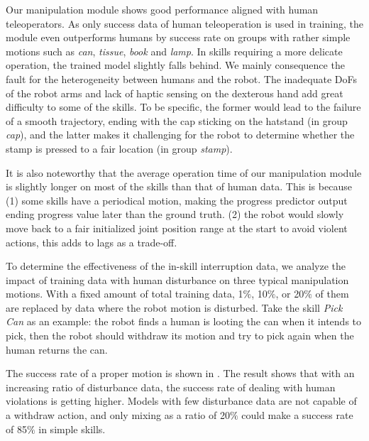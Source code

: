 Our manipulation module shows good performance aligned with human teleoperators. 
As only success data of human teleoperation is used in training, the module even outperforms humans by success rate on groups with rather simple motions such as \textit{can}, \textit{tissue}, \textit{book} and \textit{lamp}. 
In skills requiring a more delicate operation, the trained model slightly falls behind. 
We mainly consequence the fault for the heterogeneity between humans and the robot. 
The inadequate DoFs of the robot arms and lack of haptic sensing on the dexterous hand add great difficulty to some of the skills.
To be specific, the former would lead to the failure of a smooth trajectory, ending with the cap sticking on the hatstand (in group \textit{cap}), and the latter makes it challenging for the robot to determine whether the stamp is pressed to a fair location (in group \textit{stamp}).

It is also noteworthy that the average operation time of our manipulation module is slightly longer on most of the skills than that of human data. 
This is because (1) some skills have a periodical motion, making the progress predictor output ending progress value later than the ground truth. (2) the robot would slowly move back to a fair initialized joint position range at the start to avoid violent actions, this adds to lags as a trade-off.

To determine the effectiveness of the in-skill interruption data, we analyze the impact of training data with human disturbance on three typical manipulation motions. 
With a fixed amount of total training data, 1$\%$, 10$\%$, or 20$\%$ of them are replaced by data where the robot motion is disturbed.
Take the skill \textit{Pick Can} as an example: the robot finds a human is looting the can when it intends to pick, then the robot should withdraw its motion and try to pick again when the human returns the can.

The success rate of a proper motion is shown in .
The result shows that with an increasing ratio of disturbance data, the success rate of dealing with human violations is getting higher. 
Models with few disturbance data are not capable of a withdraw action, and only mixing as a ratio of 20$\%$ could make a success rate of 85$\%$ in simple skills.

